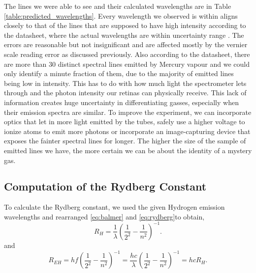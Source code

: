 \documentclass[12pt]{article}
\begin{document}
The lines we were able to see and their calculated wavelengths are in Table \ref{table:predicted_wavelengths}. Every wavelength we observed is within aligns closely to that of the lines that are supposed to have high intensity according to the datasheet, where the actual wavelengths are within uncertainty range \autocite{manuall}. The errors are reasonable but not insignificant and are affected mostly by the vernier scale reading error as discussed previously. Also according to the datasheet, there are more than 30 distinct spectral lines emitted by Mercury vapour and we could only identify a minute fraction of them, due to the majority of emitted lines being low in intensity. This has to do with how much light the spectrometer lets through and the photon intensity our retinas can physically receive. This lack of information creates huge uncertainty in differentiating gasses, especially when their emission spectra are similar. To improve the experiment, we can incorporate optics that let in more light emitted by the tubes, safely use a higher voltage to ionize atoms to emit more photons or incorporate an image-capturing device that exposes the fainter spectral lines for longer. The higher the size of the sample of emitted lines we have, the more certain we can be about the identity of a mystery gas. 

\subsection{Computation of the Rydberg Constant}
To calculate the Rydberg constant, we used the given Hydrogen emission wavelengths and rearranged \eqref{eq:balmer} and \eqref{eq:rydberg}to obtain,
\begin{equation}
    R_H=\frac{1}{\lambda} \left( \frac{1}{2^2}-\frac{1}{n^2} \right) ^{-1}.
    \label{eq:rydberg_calculation}
\end{equation}
and
\begin{equation}
    R_{EH}=hf \left( \frac{1}{2^2}-\frac{1}{n^2} \right) ^{-1}=\frac{hc}{\lambda}\left( \frac{1}{2^2}-\frac{1}{n^2} \right) ^{-1}=hcR_H.
    \label{eq:rydberg_calculation}
\end{equation}
\end{document}
